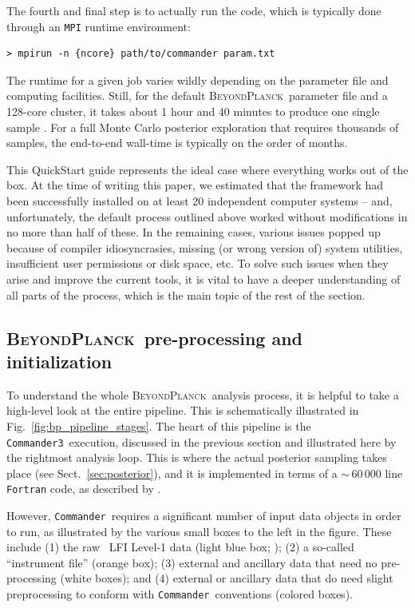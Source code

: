 \documentclass[twocolumn]{openjournal}
\def\commander{\texttt{Commander}}
\def\commanderthree{\texttt{Commander3}}
\newcommand{\BP}{\textsc{BeyondPlanck}}
\begin{document}
The fourth and final step is to actually run the code, which is typically done
through an \texttt{MPI} runtime environment:
\begin{verbatim}
> mpirun -n {ncore} path/to/commander param.txt
\end{verbatim}
The runtime for a given job varies wildly depending on the parameter file and
computing facilities. Still, for the default \BP\ parameter file and a 128-core
cluster, it takes about 1 hour and 40 minutes to produce one single sample
\citep{bp03}. For a full Monte Carlo posterior exploration that requires
thousands of samples, the end-to-end wall-time is typically on the order of
months.

This QuickStart guide represents the ideal case where everything works out of
the box. At the time of writing this paper, we estimated that the framework had
been successfully installed on at least 20 independent computer systems -- and,
unfortunately, the default process outlined above worked without modifications
in no more than half of these. In the remaining cases, various issues popped up
because of compiler idiosyncrasies, missing (or wrong version of) system
utilities, insufficient user permissions or disk space, etc. To solve such
issues when they arise and improve the current tools, it is vital to have a
deeper understanding of all parts of the process, which is the main topic of
the rest of the section.

\subsection{\BP\ pre-processing and initialization}
\label{sec:pipeline}

To understand the whole \BP\ analysis process, it is helpful to take a
high-level look at the entire pipeline. This is schematically illustrated in
Fig.~\ref{fig:bp_pipeline_stages}. The heart of this pipeline is the
\commanderthree\ execution, discussed in the previous section and illustrated
here by the rightmost analysis loop. This is where the actual posterior
sampling takes place (see Sect.~\ref{sec:posterior}), and it is implemented in
terms of a $\sim$\,60\,000 line \texttt{Fortran} code, as described by
\citet{bp03}.

However, \commander\ requires a significant number of input data objects in
order to run, as illustrated by the various small boxes to the left in the
figure. These include (1) the raw \Planck\ LFI Level-1 data (light blue box;
\citealp{planck2016-l02}); (2) a so-called ``instrument file'' (orange box);
(3) external and ancillary data that need no pre-processing (white boxes); and
(4) external or ancillary data that do need slight preprocessing to conform
with \commander\ conventions (colored boxes).
\end{document}
